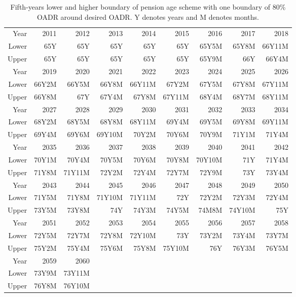 \documentclass[11pt,a4paper,]{article}
\begin{document}
\begin{table}
\begin{tabular}{rrrrrrrrr}
\hline
Year  & 2011  & 2012      & 2013   & 2014   & 2015   & 2016   & 2017   & 2018   \\
Lower & 65Y   & 65Y       & 65Y    & 65Y    & 65Y    & 65Y5M  & 65Y8M  & 66Y11M \\
Upper & 65Y   & 65Y       & 65Y    & 65Y    & 65Y    & 65Y9M  & 66Y    & 66Y4M  \\
\hline
Year  & 2019  & 2020      & 2021   & 2022   & 2023   & 2024   & 2025   & 2026   \\
Lower & 66Y2M & 66Y5M     & 66Y8M  & 66Y11M & 67Y2M  & 67Y5M  & 67Y8M  & 67Y11M \\
Upper & 66Y8M & 67Y       & 67Y4M  & 67Y8M  & 67Y11M & 68Y4M  & 68Y7M  & 68Y11M \\
\hline
Year  & 2027  & 2028      & 2029   & 2030   & 2031   & 2032   & 2033   & 2034   \\
Lower & 68Y2M & 68Y5M     & 68Y8M  & 68Y11M & 69Y4M  & 69Y5M  & 69Y8M  & 69Y11M \\
Upper & 69Y4M & 69Y6M     & 69Y10M & 70Y2M  & 70Y6M  & 70Y9M  & 71Y1M  & 71Y4M  \\
\hline
Year  & 2035  & 2036      & 2037   & 2038   & 2039   & 2040   & 2041   & 2042   \\
Lower & 70Y1M & 70Y4M     & 70Y5M  & 70Y6M  & 70Y8M  & 70Y10M & 71Y    & 71Y4M  \\
Upper & 71Y8M & 71Y11M    & 72Y2M  & 72Y4M  & 72Y7M  & 72Y9M  & 73Y    & 73Y4M  \\
\hline
Year  & 2043  & 2044      & 2045   & 2046   & 2047   & 2048   & 2049   & 2050   \\
Lower & 71Y5M & 71Y8M     & 71Y10M & 71Y11M & 72Y    & 72Y2M  & 72Y3M  & 72Y4M  \\
Upper & 73Y5M & 73Y8M     & 74Y    & 74Y3M  & 74Y5M  & 74M8M  & 74Y10M & 75Y    \\
\hline
Year  & 2051  & 2052      & 2053   & 2054   & 2055   & 2056   & 2057   & 2058   \\
Lower & 72Y5M & 72Y7M     & 72Y8M  & 72Y10M & 73Y    & 73Y2M  & 73Y4M  & 73Y7M  \\
Upper & 75Y2M & 75Y4M     & 75Y6M  & 75Y8M  & 75Y10M & 76Y    & 76Y3M  & 76Y5M  \\
\hline
Year  & 2059  & 2060 \\
Lower & 73Y9M & 73Y11M \\
Upper & 76Y8M & 76Y10M \\
\hline
\end{tabular}

\caption{Fifth-years lower and higher boundary of pension age scheme with one boundary of 80\% OADR around desired OADR. Y denotes years and M denotes months.}
\end{table}
\end{document}

